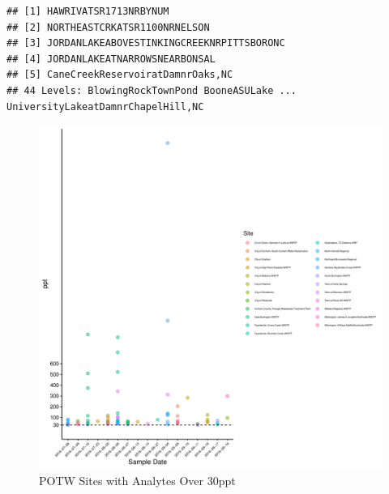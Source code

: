 \documentclass[
  12pt,
]{article}
\begin{document}
\begin{verbatim}
## [1] HAWRIVATSR1713NRBYNUM                    
## [2] NORTHEASTCRKATSR1100NRNELSON             
## [3] JORDANLAKEABOVESTINKINGCREEKNRPITTSBORONC
## [4] JORDANLAKEATNARROWSNEARBONSAL            
## [5] CaneCreekReservoiratDamnrOaks,NC         
## 44 Levels: BlowingRockTownPond BooneASULake ... UniversityLakeatDamnrChapelHill,NC
\end{verbatim}

\begin{figure}

\includegraphics{PFAS_FinalProject_files/figure-latex/unnamed-chunk-17-1} \hfill{}

\caption{POTW Sites with Analytes Over 30ppt}\label{fig:unnamed-chunk-17}
\end{figure}
\end{document}
